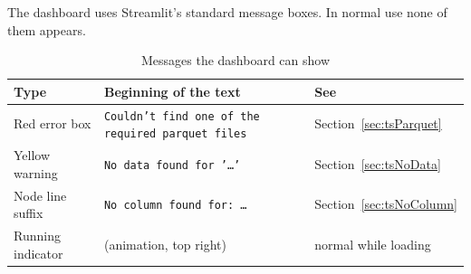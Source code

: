 The dashboard uses Streamlit's standard message boxes. In normal use none of them appears.

\begin{table}[H]
\centering
\caption{Messages the dashboard can show}
\label{tab:uiMessages}
\small
\begin{tabularx}{\linewidth}{@{}llX@{}}
\toprule
\textbf{Type} & \textbf{Beginning of the text} & \textbf{See} \\
\midrule
Red error box    & \texttt{Couldn't find one of the required parquet files} & Section~\ref{sec:tsParquet} \\
Yellow warning   & \texttt{No data found for '\dots'}                        & Section~\ref{sec:tsNoData} \\
Node line suffix & \texttt{No column found for: \dots}                       & Section~\ref{sec:tsNoColumn} \\
Running indicator & (animation, top right)                                   & normal while loading \\
\bottomrule
\end{tabularx}
\end{table}
